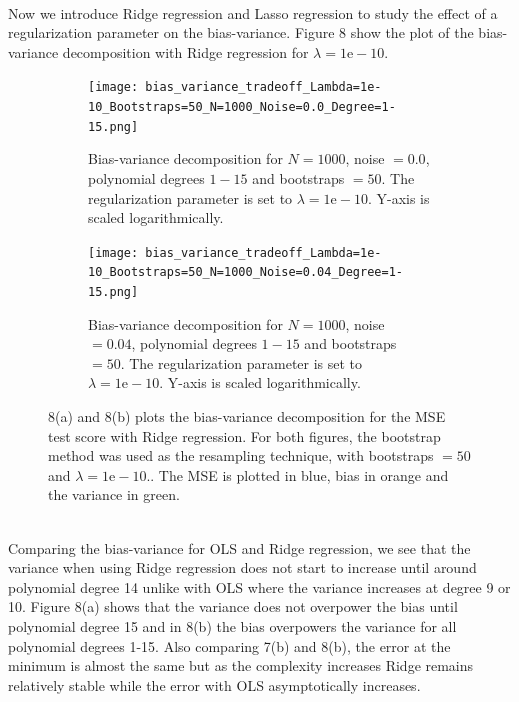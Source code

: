\documentclass[a4paper,twocolumn]{article}
\begin{document}
\\
Now we introduce Ridge regression and Lasso regression to study the effect of a regularization parameter on the bias-variance. Figure 8 show the plot of the bias-variance decomposition with Ridge regression for $\lambda = 1\textrm{e}-10$.
\begin{figure}[ht]
    \centering
    \begin{subfigure}[b]{0.9\columnwidth}
        \texttt{[image: bias\_variance\_tradeoff\_Lambda=1e-10\_Bootstraps=50\_N=1000\_Noise=0.0\_Degree=1-15.png]}
        \caption{Bias-variance decomposition for $N = 1000$, noise $= 0.0$, polynomial degrees $1- 15$ and bootstraps $= 50$. The regularization parameter is set to $\lambda = 1\textrm{e}-10$. Y-axis is scaled logarithmically.}
    \end{subfigure}
    
    \begin{subfigure}[b]{0.9\columnwidth}
        \texttt{[image: bias\_variance\_tradeoff\_Lambda=1e-10\_Bootstraps=50\_N=1000\_Noise=0.04\_Degree=1-15.png]}
        \caption{Bias-variance decomposition for $N = 1000$, noise $= 0.04$, polynomial degrees $1- 15$ and bootstraps $= 50$. The regularization parameter is set to $\lambda = 1\textrm{e}-10$. Y-axis is scaled logarithmically.}
    \end{subfigure}
    \caption{8(a) and 8(b) plots the bias-variance decomposition for the MSE test score with Ridge regression. For both figures, the bootstrap method was used as the resampling technique, with bootstraps $= 50$ and $\lambda = 1\textrm{e}-10$.. The MSE is plotted in blue, bias in orange and the variance in green. }
\end{figure}\\
Comparing the bias-variance for OLS and Ridge regression, we see that the variance when using Ridge regression does not start to increase until around polynomial degree 14 unlike with OLS where the variance increases at degree 9 or 10. Figure 8(a) shows that the variance does not overpower the bias until polynomial degree 15 and in 8(b) the bias overpowers the variance for all polynomial degrees 1-15. Also comparing 7(b) and 8(b), the error at the minimum is almost the same but as the complexity increases Ridge remains relatively stable while the error with OLS asymptotically increases.
\end{document}
